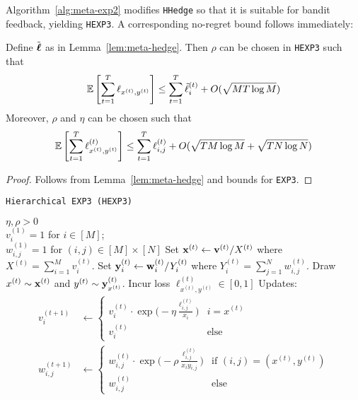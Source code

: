 Algorithm~\ref{alg:meta-exp2} modifies \texttt{HHedge} so that it is suitable for bandit feedback, yielding \texttt{HEXP3}. A corresponding no-regret bound follows immediately:

\begin{lem}\label{lem:meta-exp}
	Define $\tilde{\boldsymbol\ell}$ as in Lemma~\ref{lem:meta-hedge}. Then $\rho$ can be chosen in \texttt{HEXP3} such that
	\begin{equation}
		\operatorname*{\mathbb E}\left[\sum_{t=1}^T\ell_{x^{(t)},y^{(t)}}\right]
		\leq \sum_{t=1}^T \tilde{\ell}^{(t)}_{i}
		+ O(\sqrt{MT\log M})
	\end{equation}
	Moreover, $\rho$ and $\eta$ can be chosen such that
	\begin{equation}
		\operatorname*{\mathbb E}\left[\sum_{t=1}^{T} \ell^{(t)}_{x^{(t)},y^{(t)}}\right]
		\leq \sum_{t=1}^T\ell^{(t)}_{i,j}
		+ O(\sqrt{TM \log M} + \sqrt{T N\log N})
	\end{equation}
\end{lem}
\begin{proof}
	Follows from Lemma~\ref{lem:meta-hedge} and bounds for \texttt{EXP3}.
\end{proof}

\begin{algorithm}[tb]
   \caption{\texttt{Hierarchical EXP3 (HEXP3)}}
   \label{alg:meta-exp2}
   \begin{algorithmic}   
    $\eta,\rho>0$\\
   	 $v^{(1)}_{i}=1$ for $i\in[M]$;\\ 
   	 $w^{(1)}_{i,j}=1$ for $(i,j)\in[M]\times[N]$
	\STATE Set ${\mathbf x}^{(t)} \leftarrow {\mathbf v}^{(t)}/X^{(t)}$ where $X^{(t)} = \sum_{i=1}^M v^{(t)}_{i}$.
	\STATE Set ${\mathbf y}^{(t)}_{i} \leftarrow {\mathbf w}^{(t)}_{i}/Y^{(t)}_{i}$ where $Y^{(t)}_{i} = \sum_{j=1}^N w^{(t)}_{i,j}$.
	\STATE Draw $x^{(t)}\sim {\mathbf x}^{(t)}$ and $y^{(t)}\sim {\mathbf y}^{(t)}_{x^{(t)}}$.
	\STATE Incur loss $\ell^{(t)}_{x^{(t)},y^{(t)}}\in [0,1]$ 
	\STATE Updates:
	\begin{align}
		v^{(t+1)}_i & \leftarrow \begin{cases}
			v^{(t)}_{i}\cdot 
			\exp\big(-\eta\frac{\ell^{(t)}_{i,j}}{x_i}\big) & i=x^{(t)} \\
			v^{(t)}_{i} & \text{else}
		\end{cases}		 
		\\
		w^{(t+1)}_{i,j} & \leftarrow \begin{cases}
			w^{(t)}_{i,j}\cdot \exp\big(-\rho\frac{\ell^{(t)}_{i,j}}{x_iy_{i,j}}\big) 
			& \text{if }(i,j)=(x^{(t)}, y^{(t)}) \\
			w^{(t)}_{i,j} &\text{else}
		\end{cases}
	\end{align}
   	\ENDFOR
   	\end{algorithmic}
\end{algorithm}


